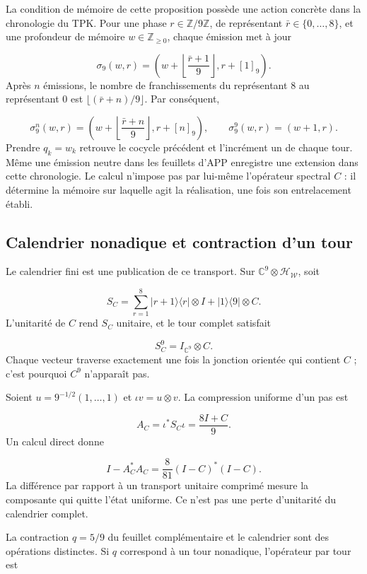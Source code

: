 La condition de mémoire de cette proposition possède une action concrète dans la chronologie du TPK. Pour une phase \(r\in\mathbb Z/9\mathbb Z\), de représentant \(\bar r\in\{0,\ldots,8\}\), et une profondeur de mémoire \(w\in\mathbb Z_{\geq0}\), chaque émission met à jour

\[
\sigma_9(w,r)=
\left(w+\left\lfloor\frac{\bar r+1}{9}\right\rfloor,r+[1]_9\right).
\]
Après \(n\) émissions, le nombre de franchissements du représentant \(8\) au représentant \(0\) est \(\lfloor(\bar r+n)/9\rfloor\). Par conséquent,

\[
\sigma_9^n(w,r)=
\left(w+\left\lfloor\frac{\bar r+n}{9}\right\rfloor,r+[n]_9\right),
\qquad
\sigma_9^9(w,r)=(w+1,r).
\]
Prendre \(q_k=w_k\) retrouve le cocycle précédent et l'incrément un de chaque tour. Même une émission neutre dans les feuillets d'APP enregistre une extension dans cette chronologie. Le calcul n'impose pas par lui-même l'opérateur spectral \(C\) : il détermine la mémoire sur laquelle agit la réalisation, une fois son entrelacement établi.

\subsection{Calendrier nonadique et contraction d’un tour}
\label{viii:rz:calendario}
Le calendrier fini est une publication de ce transport. Sur \(\mathbb C^9\otimes\mathcal H_{\mathscr W}\), soit

\[
S_C=\sum_{r=1}^{8}|r+1\rangle\langle r|\otimes I
+|1\rangle\langle9|\otimes C.
\]
L'unitarité de \(C\) rend \(S_C\) unitaire, et le tour complet satisfait

\[
S_C^9=I_{\mathbb C^9}\otimes C.
\]
Chaque vecteur traverse exactement une fois la jonction orientée qui contient \(C\) ; c’est pourquoi \(C^9\) n’apparaît pas.

Soient \(u=9^{-1/2}(1,\ldots,1)\) et \(\iota v=u\otimes v\). La compression uniforme d'un pas est

\[
A_C=\iota^*S_C\iota=\frac{8I+C}{9}.
\]
Un calcul direct donne

\[
I-A_C^*A_C
=\frac8{81}(I-C)^*(I-C).
\]
La différence par rapport à un transport unitaire comprimé mesure la composante qui quitte l'état uniforme. Ce n'est pas une perte d'unitarité du calendrier complet.

La contraction \(q=5/9\) du feuillet complémentaire et le calendrier sont des opérations distinctes. Si \(q\) correspond à un tour nonadique, l’opérateur par tour est

